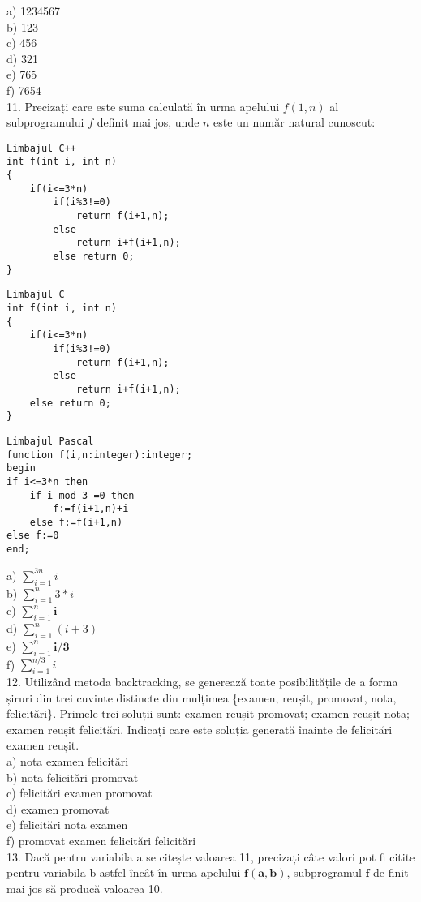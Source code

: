 a) 1234567\\
b) 123\\
c) 456\\
d) 321\\
e) 765\\
f) 7654\\
11. Precizați care este suma calculată în urma apelului $f(1, n)$ al subprogramului $f$ definit mai jos, unde $n$ este un număr natural cunoscut:

\begin{verbatim}
Limbajul C++
int f(int i, int n)
{
    if(i<=3*n)
        if(i%3!=0)
            return f(i+1,n);
        else
            return i+f(i+1,n);
        else return 0;
}
\end{verbatim}

\begin{verbatim}
Limbajul C
int f(int i, int n)
{
    if(i<=3*n)
        if(i%3!=0)
            return f(i+1,n);
        else
            return i+f(i+1,n);
    else return 0;
}
\end{verbatim}

\begin{verbatim}
Limbajul Pascal
function f(i,n:integer):integer;
begin
if i<=3*n then
    if i mod 3 =0 then
        f:=f(i+1,n)+i
    else f:=f(i+1,n)
else f:=0
end;
\end{verbatim}

a) $\sum_{i=1}^{3 n} i$\\
b) $\sum_{i=1}^{n} 3 * i$\\
c) $\sum_{i=1}^{n} \boldsymbol{i}$\\
d) $\sum_{i=1}^{n}(i+3)$\\
e) $\sum_{i=1}^{n} \boldsymbol{i} / \mathbf{3}$\\
f) $\sum_{i=1}^{n / 3} i$\\
12. Utilizând metoda backtracking, se generează toate posibilitățile de a forma șiruri din trei cuvinte distincte din mulțimea \{examen, reușit, promovat, nota, felicitări\}. Primele trei soluții sunt: examen reușit promovat; examen reușit nota; examen reușit felicitări. Indicați care este soluția generată înainte de felicitări examen reușit.\\
a) nota examen felicitări\\
b) nota felicitări promovat\\
c) felicitări examen promovat\\
d) examen promovat\\
e) felicitări nota examen\\
f) promovat examen felicitări felicitări\\
13. Dacă pentru variabila a se citește valoarea 11, precizați câte valori pot fi citite pentru variabila b astfel încât în urma apelului $\mathbf{f}(\mathbf{a}, \mathbf{b})$, subprogramul $\mathbf{f}$ de finit mai jos să producă valoarea 10.

